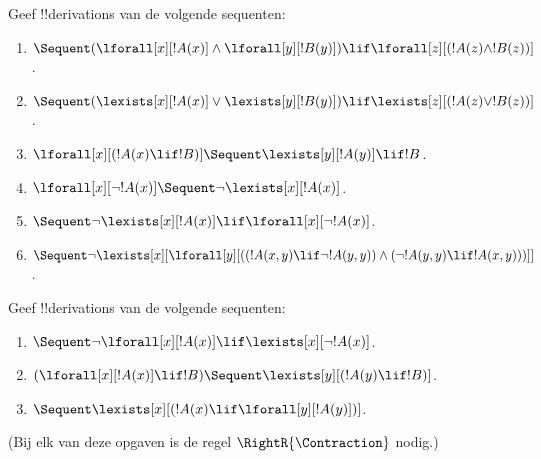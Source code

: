 \documentclass[../../../include/open-logic-section]{subfiles}
\begin{document}
\begin{prob}
Geef !!{derivation}s van de volgende sequenten:
\begin{enumerate}
\item $\Sequent (\lforall[x][!A(x)] \land \lforall[y][!B(y)]) \lif
\lforall[z][(!A(z) \land !B(z))]$.
\item $\Sequent (\lexists[x][!A(x)] \lor \lexists[y][!B(y)]) \lif
\lexists[z][(!A(z) \lor !B(z))]$.
\item $\lforall[x][(!A(x) \lif !B)] \Sequent \lexists[y][!A(y)] \lif !B$.
\item $\lforall[x][\lnot !A(x)] \Sequent \lnot\lexists[x][!A(x)]$.
\item $\Sequent \lnot\lexists[x][!A(x)] \lif \lforall[x][\lnot !A(x)]$.
\item $\Sequent \lnot\lexists[x][\lforall[y][((!A(x,y) \lif \lnot
!A(y,y)) \land (\lnot !A(y,y) \lif !A(x,y)))]]$.
\end{enumerate}
\end{prob}

\begin{prob}
Geef !!{derivation}s van de volgende sequenten:
\begin{enumerate}
\item $\Sequent \lnot\lforall[x][!A(x)] \lif \lexists[x][\lnot!A(x)]$.
\item $(\lforall[x][!A(x)] \lif !B) \Sequent \lexists[y][(!A(y) \lif !B)]$.
\item $\Sequent \lexists[x][(!A(x) \lif \lforall[y][!A(y)])]$.
\end{enumerate}
(Bij elk van deze opgaven is de regel $\RightR{\Contraction}$ nodig.)
\end{prob}
\end{document}
